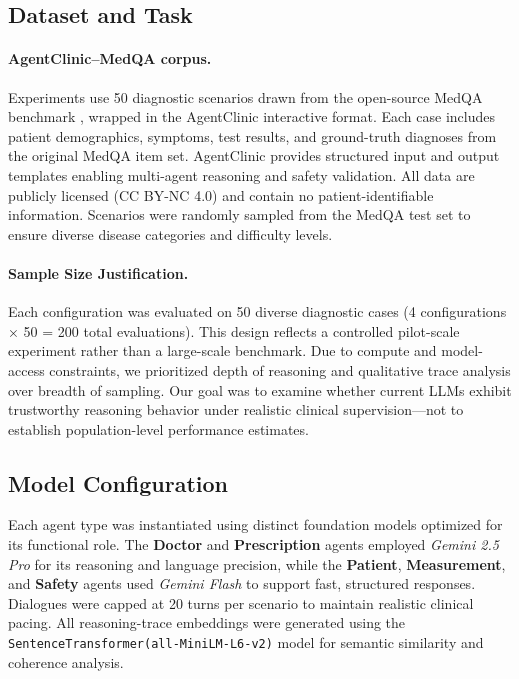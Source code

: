 \documentclass[letterpaper]{article} %
\begin{document}
\subsection{Dataset and Task}
\paragraph{AgentClinic–MedQA corpus.}
Experiments use 50 diagnostic scenarios drawn from the open-source MedQA benchmark \cite{jin2021disease}, wrapped in the AgentClinic interactive format.
Each case includes patient demographics, symptoms, test results, and ground-truth diagnoses from the original MedQA item set.
AgentClinic provides structured input and output templates enabling multi-agent reasoning and safety validation.
All data are publicly licensed (CC BY-NC 4.0) and contain no patient-identifiable information.
Scenarios were randomly sampled from the MedQA test set to ensure diverse disease categories and difficulty levels.

\paragraph{Sample Size Justification.}
Each configuration was evaluated on 50 diverse diagnostic cases (4 configurations × 50 = 200 total evaluations). 
This design reflects a controlled pilot-scale experiment rather than a large-scale benchmark. 
Due to compute and model-access constraints, we prioritized depth of reasoning and qualitative trace analysis over breadth of sampling. 
Our goal was to examine whether current LLMs exhibit trustworthy reasoning behavior under realistic clinical supervision—not to establish population-level performance estimates.


\subsection{Model Configuration}
Each agent type was instantiated using distinct foundation models optimized for its functional role. 
The \textbf{Doctor} and \textbf{Prescription} agents employed \textit{Gemini 2.5 Pro} \cite{gemini2024} for its reasoning and language precision, 
while the \textbf{Patient}, \textbf{Measurement}, and \textbf{Safety} agents used \textit{Gemini Flash} \cite{geminiFlash2024} to support fast, structured responses. 
Dialogues were capped at 20 turns per scenario to maintain realistic clinical pacing. 
All reasoning-trace embeddings were generated using the \texttt{SentenceTransformer(all-MiniLM-L6-v2)} model \cite{reimers2019sentencebert} for semantic similarity and coherence analysis.
\end{document}
